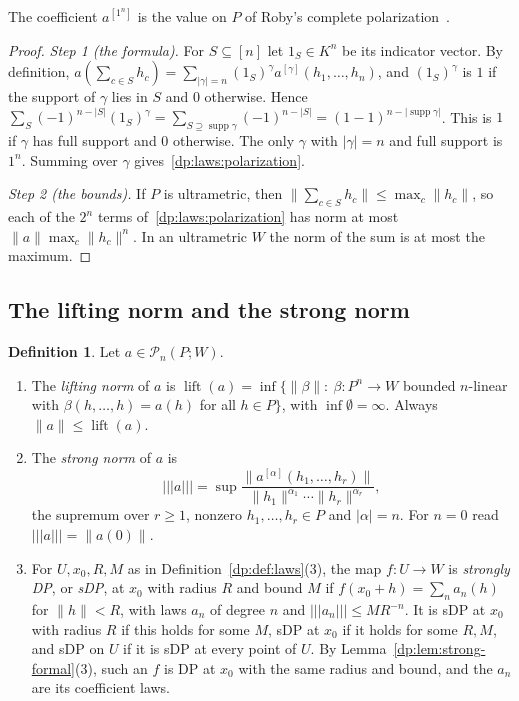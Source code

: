 \documentclass[11pt]{amsart}
\theoremstyle{definition}
\newtheorem{definition}[theorem]{Definition}
\theoremstyle{remark}
\numberwithin{equation}{section}
\newcommand{\abs}[1]{\lvert #1\rvert}
\newcommand{\norm}[1]{\lVert #1\rVert}
\theoremstyle{plain}
\theoremstyle{definition}
\theoremstyle{plain}
\newcommand{\cP}{\mathcal P}
\begin{document}
The coefficient $a^{[1^n]}$ is the value on $P$ of Roby's complete polarization~\cite[II~\S1]{Ro}.

\begin{proof}
\emph{Step 1 (the formula).} For $S\subseteq[n]$ let $1_S\in K^n$ be its indicator vector. By definition, $a(\sum_{c\in S}h_c)=\sum_{\abs\gamma=n}(1_S)^\gamma a^{[\gamma]}(h_1,\dots,h_n)$, and $(1_S)^\gamma$ is $1$ if the support of $\gamma$ lies in $S$ and $0$ otherwise. Hence $\sum_S(-1)^{n-\abs S}(1_S)^\gamma=\sum_{S\supseteq\operatorname{supp}\gamma}(-1)^{n-\abs S}=(1-1)^{n-\abs{\operatorname{supp}\gamma}}$. This is $1$ if $\gamma$ has full support and $0$ otherwise. The only $\gamma$ with $\abs\gamma=n$ and full support is $1^n$. Summing over $\gamma$ gives~\eqref{dp:laws:polarization}.

\emph{Step 2 (the bounds).} If $P$ is ultrametric, then $\norm{\sum_{c\in S}h_c}\le\max_c\norm{h_c}$, so each of the $2^n$ terms of~\eqref{dp:laws:polarization} has norm at most $\norm a\max_c\norm{h_c}^n$. In an ultrametric $W$ the norm of the sum is at most the maximum.
\end{proof}

\subsection{The lifting norm and the strong norm}

\begin{definition}\label{dp:def:strong-norm}
Let $a\in\cP_n(P;W)$.
\begin{enumerate}
\item The \emph{lifting norm} of $a$ is $\operatorname{lift}(a)=\inf\{\norm\beta:\ \beta\colon P^n\to W$ bounded $n$\nobreakdash-linear with $\beta(h,\dots,h)=a(h)$ for all $h\in P\}$, with $\inf\emptyset=\infty$. Always $\norm a\le\operatorname{lift}(a)$.
\item The \emph{strong norm} of $a$ is
\[
 \lvert\!\lvert\!\lvert a\rvert\!\rvert\!\rvert=\sup\frac{\norm{a^{[\alpha]}(h_1,\dots,h_r)}}{\norm{h_1}^{\alpha_1}\cdots\norm{h_r}^{\alpha_r}},
\]
the supremum over $r\ge1$, nonzero $h_1,\dots,h_r\in P$ and $\abs\alpha=n$. For $n=0$ read $\lvert\!\lvert\!\lvert a\rvert\!\rvert\!\rvert=\norm{a(0)}$.
\item For $U,x_0,R,M$ as in Definition~\ref{dp:def:laws}(3), the map $f\colon U\to W$ is \emph{strongly DP}, or \emph{sDP}, at $x_0$ with radius $R$ and bound $M$ if $f(x_0+h)=\sum_na_n(h)$ for $\norm h<R$, with laws $a_n$ of degree $n$ and $\lvert\!\lvert\!\lvert a_n\rvert\!\rvert\!\rvert\le MR^{-n}$. It is sDP at $x_0$ with radius $R$ if this holds for some $M$, sDP at $x_0$ if it holds for some $R,M$, and sDP on $U$ if it is sDP at every point of $U$. By Lemma~\ref{dp:lem:strong-formal}(3), such an $f$ is DP at $x_0$ with the same radius and bound, and the $a_n$ are its coefficient laws.
\end{enumerate}
\end{definition}
\end{document}
